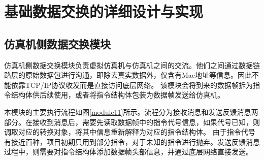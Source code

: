 \chapter{基础数据交换的详细设计与实现}
\section{仿真机侧数据交换模块}
仿真机侧数据交换模块负责虚拟仿真机与仿真机之间的交流。他们之间通过数据链路层的原始数据包进行沟通，即除去真实数据外，仅含有Mac地址等信息。因此不能依靠TCP/IP协议收发而是直接访问底层网络。
该模块会将到来的数据帧拆为指令结构体供后续使用，或者将指令结构体包装为数据帧发送给仿真机。
\par
本模块的主要执行流程如图\ref{module11}所示。流程分为接收消息和发送反馈消息两部分。在接收到消息后，需要先读取数据帧中的指令代号信息，如果代号已知，则调取对应的转换对象，将其中信息重新解释为对应的指令结构体。
由于指令代号有接近百种，项目初期只用到部分指令，对于未知的指令进行抛弃。发送反馈消息过程中，则需要对指令结构体添加数据帧头部信息，并通过底层网络直接发送。

